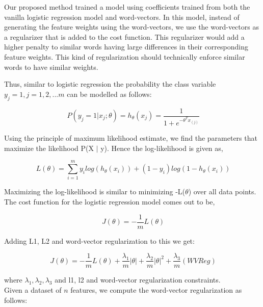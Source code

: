 Our proposed method trained a model using coefficients trained from both the vanilla logistic regression model and word-vectors. In this model, instead of generating the feature weights using the word-vectors, we use the word-vectors as a regularizer that is added to the cost function. This regularizer would add a higher penalty to similar words having large differences in their corresponding feature weights. This kind of regularization should technically enforce similar words to have similar weights.

Thus, similar to logistic regression the probability the class variable $y_{j}=1, j=1,2,...m$ can be modelled as follows:

\begin{equation}
\ P(y_{j}  = 1 | x_{j}; \theta) = h_{\theta}(x_{j}) = \frac{1}{1+e^{-\theta^{T}x_{(j)}}}
\end{equation}

Using the principle of maximum likelihood estimate, we find the parameters that maximize the likelihood P(X $|$ y). Hence the log-likelihood is given as,

\begin{equation}
\ L(\theta) = \sum_{i=1}^{m}{y_{i}log(h_{\theta}(x_{i})) + (1-y_{i})log(1-h_{\theta}(x_{i}))}
\end{equation}

Maximizing the log-likelihood is similar to minimizing -L($\theta$) over all data points. The cost function for the logistic regression model comes out to be,

\begin{equation}
\ J(\theta) = -\frac{1}{m}{L(\theta)}
\end{equation}

Adding L1, L2 and word-vector regularization to this we get:

\begin{equation}
\ J(\theta) = -\frac{1}{m}{L(\theta)} + \frac{\lambda_{1}}{m}{|{\theta}|} + \frac{\lambda_{2}}{m}{|{\theta}|}^{2} + 
\frac{\lambda_{3}}{m}{(WV Reg)}
\end{equation}

where $\lambda_{1}, \lambda_{2}, \lambda_{3}$ and l1, l2 and word-vector regularization constraints.\\

\noindent Given a dataset of $n$ features, we compute the word-vector regularization as follows:

